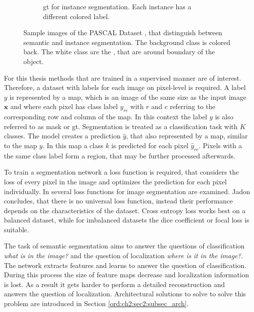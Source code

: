 \begin{figure} [h]
\begin{subfigure}[t]{0.3\textwidth}
		\caption{
			\gls{gt} for instance segmentation.
			Each instance has a different colored label.
		}\label{fig:ch2:sec3:instance_seg}
	\end{subfigure}
	\caption[Semantic and instance segmentation]{
		Sample images of the PASCAL  Dataset \cite{Eve20-PascalVOC}, that distinguish between semantic and instance segmentation.
		The background class is colored back.
		The white class are the , that are around boundary of the object.
	}\label{fig:ch2:sec2:segmentation_image}
\end{figure}

For this thesis methods that are trained in a supervised manner are of interest.
Therefore, a dataset with labels for each image on pixel-level is required.
A label $y$ is represented by a map, which is an image of the same size as the input image $\textbf{x}$ and where each pixel has class label $y_{rc}$ with $r$ and $c$ referring to the corresponding row and column of the map. 
In this context the label $y$ is also referred to as mask or \gls{gt}.
Segmentation is treated as a classification task with $K$ classes.
The model creates a prediction $\hat{y}$, that also represented by a map, similar to the map $y$.
In this map a class $k$ is predicted for each pixel $\hat{y}_{rc}$.
Pixels with a the same class label form a region, that may be further processed afterwards.

To train a segmentation network a loss function is required, that considers the loss of every pixel in the image and optimizes the prediction for each pixel individually.
In \cite{Jad20-LossFunction} several loss functions for image segmentation are examined.
Jadon concludes, that there is no universal loss function, instead their performance depends on the characteristics of the dataset.
Cross entropy loss works best on a balanced dataset, while for imbalanced datasets the dice coefficient or focal loss is suitable.

The task of semantic segmentation aims to answer the questions of classification \emph{what is in the image?} and the question of localization \emph{where is it in the image?}.
The network extracts features and learns to answer the question of classification.
During this process the size of feature maps decrease and localization information is lost.
As a result it gets harder to perform a detailed reconstruction and answers the question of localization.
Architectural solutions to solve to solve this problem are introduced in Section \ref{ord:ch2:sec2:subsec_arch}.

